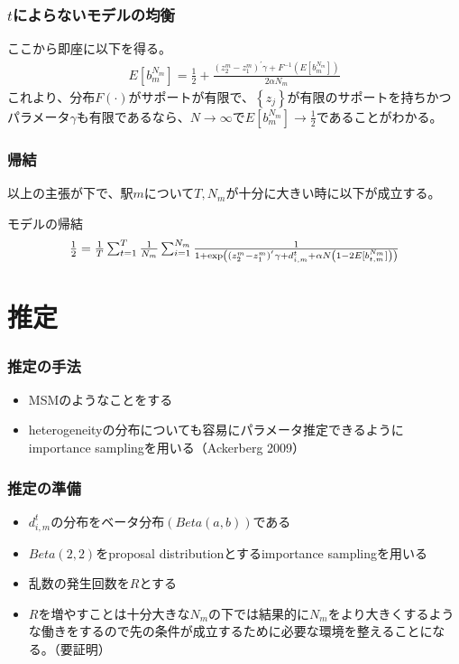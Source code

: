 \documentclass[dvipdfmx, 12pt]{beamer}
\begin{document}
\begin{frame}\frametitle{$t$によらないモデルの均衡}
	ここから即座に以下を得る。
        \begin{align*}
        	E[b_m^{N_m}] = \frac{1}{2} + \frac{(z_2^m - z_1^m)^{'}\gamma + F^{-1} \left( E[b_m^{N_m}] \right)}{2\alpha N_m}
        \end{align*}
これより、分布$F(\cdot)$がサポートが有限で、$\left\{ z_j \right\}$が有限のサポートを持ちかつパラメータ$\gamma$も有限であるなら、$N \to \infty$で$E[b_m^{N_m}] \to \frac{1}{2}$であることがわかる。
\end{frame}

\begin{frame}\frametitle{帰結}
	以上の主張が下で、駅$m$について$T,N_m$が十分に大きい時に以下が成立する。
	
	\begin{itembox}[l]{モデルの帰結}
        \begin{align*}
        \scalebox{1}{$
        	\frac{1}{2} = \frac{1}{T}\sum_{t = 1}^T \frac{1}{N_m}\sum_{i = 1}^{N_m} \frac{1}{1 + \exp\left( (z_2^m - z_1^m)^{'}\gamma + d_{i,m}^t + \alpha N \left(1 - 2E[b_{t,m}^{N_m}]\right) \right)} $}
        \end{align*}
        \end{itembox}
\end{frame}

\section{推定}
\begin{frame}\frametitle{推定の手法}
	\begin{itemize}
		\item MSMのようなことをする
		\item heterogeneityの分布についても容易にパラメータ推定できるようにimportance samplingを用いる（Ackerberg 2009）
	\end{itemize}
\end{frame}

\begin{frame}\frametitle{推定の準備}
	\begin{itemize}
		\item $d_{i,m}^t$の分布をベータ分布$(Beta(a, b))$である
		\item $Beta(2,2)$をproposal distributionとするimportance samplingを用いる
		\item 乱数の発生回数を$R$とする
		\item $R$を増やすことは十分大きな$N_m$の下では結果的に$N_m$をより大きくするような働きをするので先の条件が成立するために必要な環境を整えることになる。（要証明）
	\end{itemize}
\end{frame}
\end{document}
